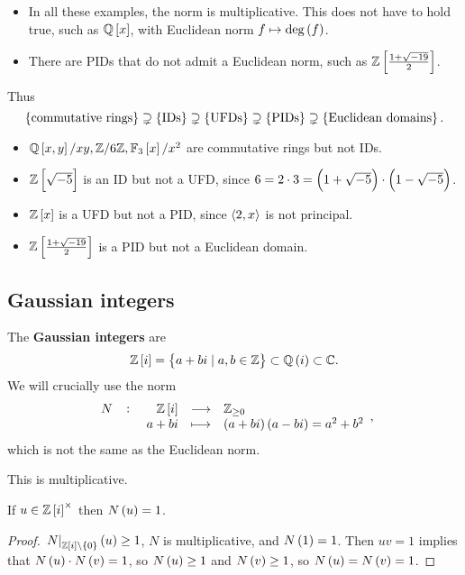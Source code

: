 \begin{remark*}
\hfill
\begin{itemize}
\item In all these examples, the norm is multiplicative. This does not have to hold true, such as $ \Q\sbr{x} $, with Euclidean norm $ f \mapsto \deg\br{f} $.
\item There are PIDs that do not admit a Euclidean norm, such as $ \Z\sbr{\tfrac{1 + \sqrt{-19}}{2}} $.
\end{itemize}
\end{remark*}

Thus
$$ \cbr{\text{commutative rings}} \supsetneq \cbr{\text{IDs}} \supsetneq \cbr{\text{UFDs}} \supsetneq \cbr{\text{PIDs}} \supsetneq \cbr{\text{Euclidean domains}}. $$
\begin{itemize}
\item $ \Q\sbr{x, y} / xy, \Z / 6\Z, \F_3\sbr{x} / x^2 $ are commutative rings but not IDs.
\item $ \Z\sbr{\sqrt{-5}} $ is an ID but not a UFD, since $ 6 = 2 \cdot 3 = \br{1 + \sqrt{-5}} \cdot \br{1 - \sqrt{-5}} $.
\item $ \Z\sbr{x} $ is a UFD but not a PID, since $ \left\langle 2, x \right\rangle $ is not principal.
\item $ \Z\sbr{\tfrac{1 + \sqrt{-19}}{2}} $ is a PID but not a Euclidean domain.
\end{itemize}

\pagebreak

\subsection{Gaussian integers}

The \textbf{Gaussian integers} are
$$ \Z\sbr{i} = \cbr{a + bi \mid a, b \in \Z} \subset \Q\br{i} \subset \C. $$
We will crucially use the norm
$$ \function[N]{\Z\sbr{i}}{\Z_{\ge 0}}{a + bi}{\br{a + bi}\br{a - bi} = a^2 + b^2}, $$
which is not the same as the Euclidean norm.

\begin{note*}
This is multiplicative.
\end{note*}

\begin{proposition}
If $ u \in \Z\sbr{i}^\times $ then $ N\br{u} = 1 $.
\end{proposition}

\begin{proof}
$ \eval{N}_{\Z\sbr{i} \setminus \cbr{0}}\br{u} \ge 1 $, $ N $ is multiplicative, and $ N\br{1} = 1 $. Then $ uv = 1 $ implies that $ N\br{u} \cdot N\br{v} = 1 $, so $ N\br{u} \ge 1 $ and $ N\br{v} \ge 1 $, so $ N\br{u} = N\br{v} = 1 $.
\end{proof}

